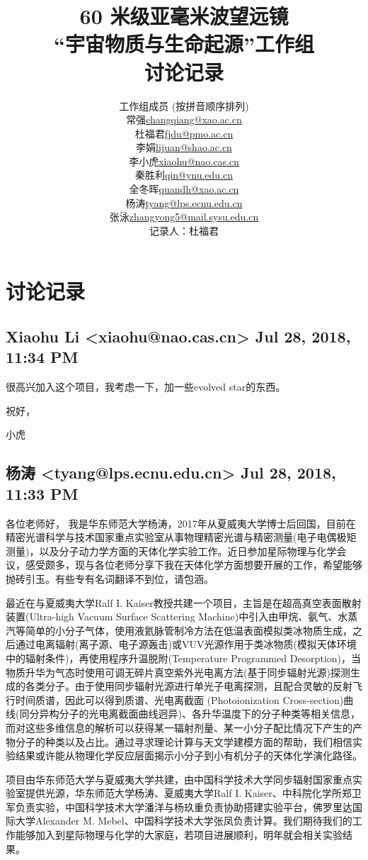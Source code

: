 \documentclass{article}
\title{60 米级亚毫米波望远镜 \\ {“宇宙物质与生命起源”工作组} \\ {讨论记录}}
\author{
\begin{tabular}{ll}
\hline
\multicolumn{2}{c}{工作组成员 (按拼音顺序排列)} \\
%
常强 & \url{changqiang@xao.ac.cn} \\
杜福君 & \url{fjdu@pmo.ac.cn} \\
李娟 & \url{lijuan@shao.ac.cn} \\
李小虎 & \url{xiaohu@nao.cas.cn} \\
秦胜利 & \url{qin@ynu.edu.cn} \\
全冬晖 & \url{quandh@xao.ac.cn} \\
杨涛 & \url{tyang@lps.ecnu.edu.cn} \\
张泳 & \url{zhangyong5@mail.sysu.edu.cn} \\
\hline
\multicolumn{2}{c}{记录人：杜福君} \\
\hline
\end{tabular}
}
\newcommand\from[2]{\subsection{{#1} {#2}}}
\newcommand\said[1]{#1}
\begin{document}
\maketitle

\section{讨论记录}

\from{
Xiaohu Li <xiaohu@nao.cas.cn>
}{
Jul 28, 2018, 11:34 PM
}
\said{
很高兴加入这个项目，我考虑一下，加一些evolved star的东西。

祝好，

小虎
}

\from{
杨涛 <tyang@lps.ecnu.edu.cn>
}{
Jul 28, 2018, 11:33 PM
}
\said{
各位老师好，
我是华东师范大学杨涛，2017年从夏威夷大学博士后回国，目前在精密光谱科学与技术国家重点实验室从事物理精密光谱与精密测量(电子电偶极矩测量)，以及分子动力学方面的天体化学实验工作。近日参加星际物理与化学会议，感受颇多，现与各位老师分享下我在天体化学方面想要开展的工作，希望能够抛砖引玉。有些专有名词翻译不到位，请包涵。

最近在与夏威夷大学Ralf I. Kaiser教授共建一个项目，主旨是在超高真空表面散射装置(Ultra-high Va­cu­um Surface Scat­tering Ma­chi­ne)中引入由甲烷、氨气、水蒸汽等简单的小分子气体，使用液氦脉管制冷方法在低温表面模拟类冰物质生成，之后通过电离辐射(离子源、电子源轰击)或VUV光源作用于类冰物质(模拟天体环境中的辐射条件)，再使用程序升温脱附(Temperature Programmed Desorption)，当物质升华为气态时使用可调无碎片真空紫外光电离方法(基于同步辐射光源)探测生成的各类分子。由于使用同步辐射光源进行单光子电离探测，且配合灵敏的反射飞行时间质谱，因此可以得到质谱、光电离截面 (Photoionization Cross-section)曲线(同分异构分子的光电离截面曲线迥异)、各升华温度下的分子种类等相关信息，而对这些多维信息的解析可以获得某一辐射剂量、某一小分子配比情况下产生的产物分子的种类以及占比。通过寻求理论计算与天文学建模方面的帮助，我们相信实验结果或许能从物理化学反应层面揭示小分子到小有机分子的天体化学演化路径。

项目由华东师范大学与夏威夷大学共建，由中国科学技术大学同步辐射国家重点实验室提供光源，华东师范大学杨涛、夏威夷大学Ralf I. Kaiser、中科院化学所郑卫军负责实验，中国科学技术大学潘洋与杨玖重负责协助搭建实验平台，佛罗里达国际大学Alexander M. Mebel、中国科学技术大学张凤负责计算。我们期待我们的工作能够加入到星际物理与化学的大家庭，若项目进展顺利，明年就会相关实验结果。
}
\end{document}
